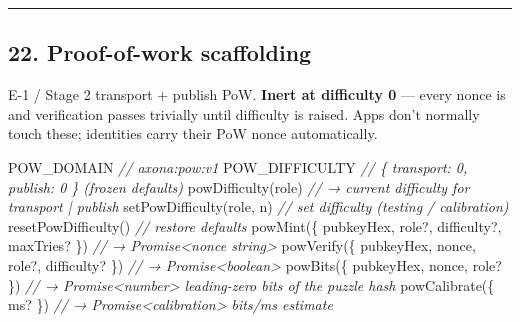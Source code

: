 \documentclass[
  nobib]{tufte-handout}
\newenvironment{Shaded}{}{}
\newcommand{\CommentTok}[1]{\textcolor[rgb]{0.38,0.63,0.69}{\textit{#1}}}
\newcommand{\FunctionTok}[1]{\textcolor[rgb]{0.02,0.16,0.49}{#1}}
\newcommand{\NormalTok}[1]{#1}
\newcommand{\OperatorTok}[1]{\textcolor[rgb]{0.40,0.40,0.40}{#1}}
\begin{document}
\begin{center}\rule{0.5\linewidth}{0.5pt}\end{center}

\subsection{22. Proof-of-work
scaffolding}\label{proof-of-work-scaffolding}

E-1 / Stage 2 transport + publish PoW. \textbf{Inert at difficulty 0}
--- every nonce is \texttt{\textquotesingle{}\textquotesingle{}} and
verification passes trivially until difficulty is raised. Apps don't
normally touch these; identities carry their PoW nonce automatically.

\begin{Shaded}
\begin{Highlighting}[]
\NormalTok{POW\_DOMAIN                                   }\CommentTok{// \textquotesingle{}axona:pow:v1\textquotesingle{}}
\NormalTok{POW\_DIFFICULTY                               }\CommentTok{// \{ transport: 0, publish: 0 \} (frozen defaults)}
\FunctionTok{powDifficulty}\NormalTok{(role)                          }\CommentTok{// → current difficulty for \textquotesingle{}transport\textquotesingle{} | \textquotesingle{}publish\textquotesingle{}}
\FunctionTok{setPowDifficulty}\NormalTok{(role}\OperatorTok{,}\NormalTok{ n)                    }\CommentTok{// set difficulty (testing / calibration)}
\FunctionTok{resetPowDifficulty}\NormalTok{()                         }\CommentTok{// restore defaults}
\FunctionTok{powMint}\NormalTok{(\{ pubkeyHex}\OperatorTok{,}\NormalTok{ role}\OperatorTok{?,}\NormalTok{ difficulty}\OperatorTok{?,}\NormalTok{ maxTries}\OperatorTok{?}\NormalTok{ \})  }\CommentTok{// → Promise\textless{}nonce string\textgreater{}}
\FunctionTok{powVerify}\NormalTok{(\{ pubkeyHex}\OperatorTok{,}\NormalTok{ nonce}\OperatorTok{,}\NormalTok{ role}\OperatorTok{?,}\NormalTok{ difficulty}\OperatorTok{?}\NormalTok{ \})    }\CommentTok{// → Promise\textless{}boolean\textgreater{}}
\FunctionTok{powBits}\NormalTok{(\{ pubkeyHex}\OperatorTok{,}\NormalTok{ nonce}\OperatorTok{,}\NormalTok{ role}\OperatorTok{?}\NormalTok{ \})         }\CommentTok{// → Promise\textless{}number\textgreater{} leading{-}zero bits of the puzzle hash}
\FunctionTok{powCalibrate}\NormalTok{(\{ ms}\OperatorTok{?}\NormalTok{ \})                        }\CommentTok{// → Promise\textless{}calibration\textgreater{} bits/ms estimate}
\end{Highlighting}
\end{Shaded}
\end{document}
